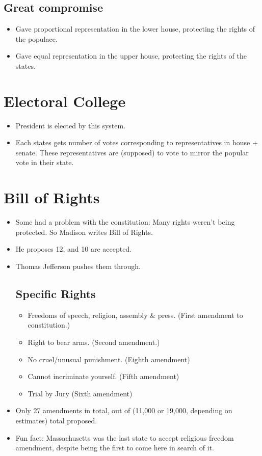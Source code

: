 \documentclass{article}
\begin{document}
  \subsection{Great compromise}
    \begin{itemize}
      \item Gave proportional representation in the lower house, protecting the rights of the populace.
      \item Gave equal representation in the upper house, protecting the rights of the states.
    \end{itemize}

\section{Electoral College}
\begin{itemize}
    \item President is elected by this system.
    \item Each states gets number of votes corresponding to representatives in house + senate. These representatives are (supposed) to vote to mirror the popular vote in their state. 
  \end{itemize}

\section{Bill of Rights}
  \begin{itemize}
    \item Some had a problem with the constitution: Many rights weren't being protected. So Madison writes Bill of Rights. 
    \item He proposes 12, and 10 are accepted. 
    \item Thomas Jefferson pushes them through.
    \subsection{Specific Rights}
      \begin{itemize}
        \item Freedoms of speech, religion, assembly \& press. (First amendment to constitution.)
        \item Right to bear arms. (Second amendment.)
        \item No cruel/unusual punishment. (Eighth amendment)
        \item Cannot incriminate yourself. (Fifth amendment)
        \item Trial by Jury (Sixth amendment)
      \end{itemize}
    \item Only 27 amendments in total, out of (11,000 or 19,000, depending on estimates) total proposed.
    \item Fun fact: Massachusetts was the last state to accept religious freedom amendment, despite being the first to come here in search of it.
  \end{itemize}
\end{document}
